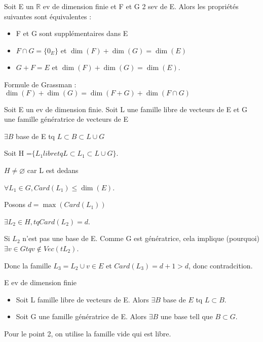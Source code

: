 \documentclass[french]{yLectureNote}
\newcommand{\R}[0]{\mathbb{R}}
\begin{document}
\begin{proposition}
Soit E un $\R$ ev de dimension finie et F et G 2 sev de E. Alors les propriétés suivantes sont équivalentes :
\begin{itemize}
 \item F et G sont supplémentaires dans E
 \item $F\cap G = \{0_E\}$ et $\dim(F)+\dim(G) = \dim(E)$
 \item $G+F = E$ et $\dim(F)+\dim(G) = \dim(E)$.
\end{itemize}

\end{proposition}
\begin{myproof}
 Formule de Grassman : \(\dim(F)+\dim(G) = \dim(F+G) + \dim(F\cap G)\)
\end{myproof}
\begin{proposition}
Soit E un ev de dimension finie. Soit L une famille libre de vecteurs de E et G une famille génératrice de vecteurs de E

$\exists B$ base de E tq $L\subset B\subset L\cup G$
\end{proposition}
\begin{myproof}
 Soit H =$\{L_1 libre tq L\subset L_1\subset L\cup G\}$.

 $H\neq \varnothing$  car L est dedans

 $\forall L_1\in G, Card(L_1)\leq \dim(E)$.

 Posons $d = \max(Card(L_1))$

 $\exists L_2 \in H, tq Card(L_2) = d$.

 Si $L_2$ n'est pas une base de E. Comme G est génératrice, cela implique  (pourquoi) $\exists v\in G tq v\notin Vec(tL_2)$.

 Donc la famille $L_3 = L_2 \cup {v} \in E$ et $Card(L_3) = d+1>d$, donc contradcition.
\end{myproof}
\begin{theorem}
 E ev de dimension finie
 \begin{itemize}
  \item Soit L famille libre de vecteurs de E. Alors $\exists B$ base de $E$ tq $L\subset B$.
  \item Soit G une famille génératrice de E. Alors $\exists B$ une base tell que $B\subset G$.
 \end{itemize}

\end{theorem}
Pour le point 2, on utilise la famille vide qui est libre.
\end{document}
